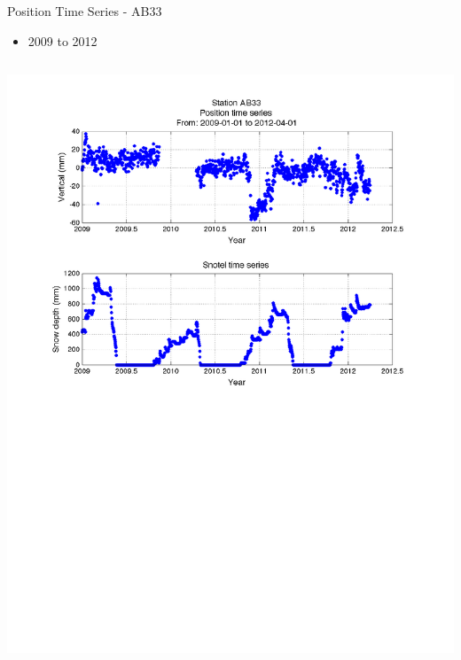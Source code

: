 \documentclass{beamer}
\begin{document}
\begin{frame}{Position Time Series - AB33}
\begin{itemize}
\item 2009 to 2012\\
\end{itemize}

\begin{columns}
\includegraphics[width=1\linewidth,trim=70 300 70 50, clip=true]{logan/ab33_pos.pdf}


\end{columns}
\end{frame}
\end{document}
